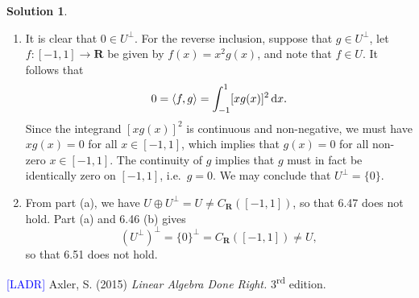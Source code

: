 \documentclass[12pt]{article}
\theoremstyle{definition}
\theoremstyle{exercise}
\theoremstyle{solution}
\newtheorem*{solution}{Solution}
\newcommand{\upd}{\,\text{d}}
\newcommand{\ts}{\textsuperscript}
\newcommand{\ocomp}[1]{#1^{\perp}}
\newcommand{\R}{\mathbf{R}}
\DeclarePairedDelimiter\ip{\langle}{\rangle}
\begin{document}
\begin{solution}
    \begin{enumerate}
        \item It is clear that \( 0 \in \ocomp{U} \). For the reverse inclusion, suppose that \( g \in \ocomp{U} \), let \( f : [-1, 1] \to \R \) be given by \( f(x) = x^2 g(x) \), and note that \( f \in U \). It follows that
        \[
            0 = \ip{f, g} = \int_{-1}^1 [x g(x)]^2 \upd x.
        \]
        Since the integrand \( [x g(x)]^2 \) is continuous and non-negative, we must have \( x g(x) = 0 \) for all \( x \in [-1, 1] \), which implies that \( g(x) = 0 \) for all non-zero \( x \in [-1, 1] \). The continuity of \( g \) implies that \( g \) must in fact be identically zero on \( [-1, 1] \), i.e.\ \( g = 0 \). We may conclude that \( \ocomp{U} = \{ 0 \} \).

        \item From part (a), we have \( U \oplus \ocomp{U} = U \neq C_{\R}([-1, 1]) \), so that 6.47 does not hold. Part (a) and 6.46 (b) gives
        \[
            \ocomp{(\ocomp{U})} = \ocomp{\{ 0 \}} = C_{\R}([-1, 1]) \neq U,
        \]
        so that 6.51 does not hold.
    \end{enumerate}
\end{solution}

\noindent \hrulefill

\noindent \hypertarget{ladr}{\textcolor{blue}{[LADR]} Axler, S. (2015) \textit{Linear Algebra Done Right.} 3\ts{rd} edition.}
\end{document}
